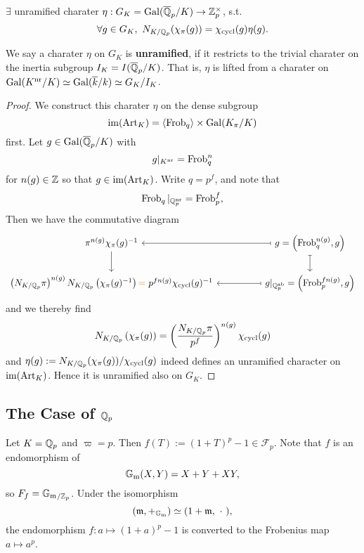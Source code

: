 \begin{corollary}\label{norm of lubin-tate char = cycl char * unramified char}
    $\exists$ unramified charater $\eta : G_K = \operatorname{Gal}(\overline{\mathbb{Q}}_p/K)\to\mathbb{Z}_p^\times$, s.t.\[\forall g\in G_K,\ N_{K/\mathbb{Q}_p}(\chi_\pi(g)) = \chi_{\mathrm{cycl}}(g)\eta(g).\]
\end{corollary}
We say a charater $\eta$ on $G_K$ is \textbf{unramified}, if it restricts to the trivial charater on the inertia subgroup $I_K = I(\overline{\mathbb{Q}}_p/K)$.
That is, $\eta$ is lifted from a charater on $\operatorname{Gal}(K^{\mathrm{nr}}/K)\simeq\operatorname{Gal}(\overline k/k)\simeq G_K/ I_K$.
\begin{proof}
    We construct this charater $\eta$ on the dense subgroup \[\operatorname{im}(\operatorname{Art}_K) = \left\langle \operatorname{Frob}_q \right\rangle\times\operatorname{Gal}(K_\pi/K)\] first.
    Let $g\in\operatorname{Gal}(\overline{\mathbb{Q}}_p/K)$ with \[g|_{K^{\mathrm{nr}}} = \operatorname{Frob}_q^n\] for $n(g)\in\mathbb{Z}$ so that $g\in \operatorname{im}(\operatorname{Art}_K)$.
    Write $q = p^f$, and note that \[\operatorname{Frob}_q|_{\mathbb{Q}_p^{\mathrm{nr}}} = \operatorname{Frob}_p^f,\]
    Then we have the commutative diagram%
    \[\begin{tikzcd}
        {\pi^{n(g)}\chi_\pi(g)^{-1}} &&
        {g=\left( \frob_q^{n(g)}, g \right)} \\
        {\left(N_{K/\Q_p}\pi\right)^{n(g)} N_{K/\Q_p}\left(\chi_\pi(g)^{-1}\right)
        {\color{orange} =}
        \ p^{fn(g)}\chi_\cyc(g)^{-1}}
        && {g|_{\Q_p^\ab}= \left( \frob_p^{fn(g)}, g \right)}
        \arrow[from=1-1, to=2-1]
        \arrow[maps to, from=1-3, to=1-1]
        \arrow[maps to, from=1-3, to=2-3]
        \arrow[maps to, from=2-3, to=2-1]
    \end{tikzcd}\]
    and we thereby find \[N_{K/\mathbb{Q}_p}\left( \chi_\pi(g) \right) = \left( 
        \frac{N_{K/\mathbb{Q}_p}\pi }{p^f }
    \right)^{n(g)}\chi_{\mathrm{cycl}}(g)\]
    and $\eta(g) := N_{K/\mathbb{Q}_p}(\chi_\pi(g))/\chi_{\mathrm{cycl}}(g)$ indeed defines an unramified character on $\operatorname{im}(\operatorname{Art}_K)$.
    Hence it is unramified also on $G_K$.
\end{proof}

\subsection{The Case of \texorpdfstring{$\mathbb{Q}_p$}{}}
Let $K = \mathbb{Q}_p$ and $\varpi = p$. Then $f(T) := (1 + T)^p - 1\in\mathcal{F}_p$.
Note that $f$ is an endomorphism of \[{\mathbb{G}_{\mathrm{m}}}(X, Y) = X + Y + XY,\] so $F_f = {\mathbb{G}_{\mathrm{m}}}{}_{/\mathbb{Z}_p}$. Under the isomorphism
\[(\mathfrak{m}, +_{{\mathbb{G}_{\mathrm{m}}}})\simeq (1 + \mathfrak{m},\ \cdot\ ),\]
the endomorphism $f : a\mapsto (1 + a)^p - 1$ is converted to the Frobenius map $a\mapsto a^p$.


